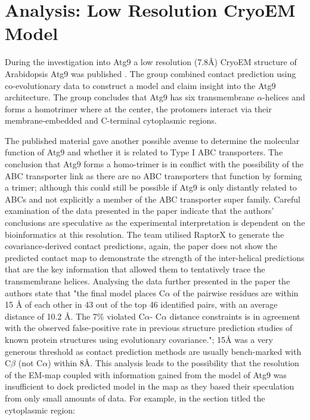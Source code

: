 \section{Analysis: Low Resolution CryoEM Model}

During the investigation into Atg9 a low resolution (7.8Å) CryoEM structure of Arabidopsis Atg9 was published \cite{Lai2020}.  The group combined contact prediction using co-evolutionary data to construct a model and claim insight into the Atg9 architecture.  The group concludes that Atg9 has six transmembrane $\alpha$-helices and forms a homotrimer where at the center, the protomers interact via their membrane-embedded and C-terminal cytoplasmic regions. 

The published material gave another possible avenue to determine the molecular function of Atg9 and whether it is related to Type I ABC transporters.  The conclusion that Atg9 forms a homo-trimer is in conflict with the possibility of the ABC transporter link as there are no ABC transporters that function by forming a trimer; although this could still be possible if Atg9 is only distantly related to ABCs and not explicitly a member of the ABC transporter super family. Careful examination of the data presented in the paper indicate that the authors' conclusions are speculative as the experimental interpretation is dependent on the bioinformatics at this resolution.  The team utilised RaptorX \cite{Ma2015} to generate the covariance-derived contact predictions, again, the paper does not show the predicted contact map to demonstrate the strength of the inter-helical predictions that are the key information that allowed them to tentatively trace the transmembrane helices. Analysing the data further presented in the paper the authors state that "the final model places C$\alpha$ of the pairwise residues are within 15 Å of each other in 43 out of the top 46 identified pairs, with an average distance of 10.2 Å. The 7\% violated C$\alpha$- C$\alpha$ distance constraints is in agreement with the observed false-positive rate in previous structure prediction studies of known protein structures using evolutionary covariance."; 15Å was a very generous threshold as contact prediction methods are usually bench-marked with C$\beta$ (not C$\alpha$) within 8Å.  This analysis leads to the possibility that the resolution of the EM-map coupled with information gained from the model of Atg9 was insufficient to dock predicted model in the map as they based their speculation from only small amounts of data. For example, in the section titled the cytoplasmic region:

